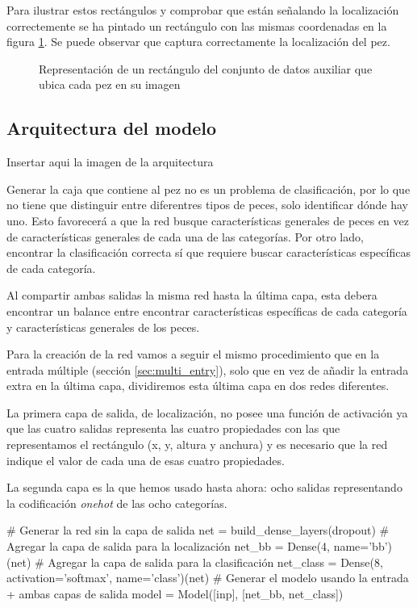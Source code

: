 Para ilustrar estos rectángulos y comprobar que están señalando la localización
correctemente se ha pintado un rectángulo con las mismas coordenadas en la
figura \ref{box}. Se puede observar que captura correctamente la localización
del pez.


\begin{figure}
  \caption{Representación de un rectángulo del conjunto de datos auxiliar que ubica cada pez en su imagen}
\label{box}
\end{figure}


\subsection{Arquitectura del modelo}

Insertar aqui la imagen de la arquitectura

Generar la caja que contiene al pez no es un problema de clasificación, por lo
que no tiene que distinguir entre diferentres tipos de peces, solo identificar
dónde hay uno. Esto favorecerá a que la red busque características generales de
peces en vez de características generales de cada una de las categorías. Por
otro lado, encontrar la clasificación correcta sí que requiere buscar
características específicas de cada categoría.

Al compartir ambas salidas la misma red hasta la última capa, esta debera
encontrar un balance entre encontrar características específicas de cada categoría y
características generales de los peces.

Para la creación de la red vamos a seguir el mismo procedimiento que en la
entrada múltiple (sección \ref{sec:multi_entry}), solo que en vez de añadir la
entrada extra en la última capa, dividiremos esta última capa en dos redes
diferentes.

La primera capa de salida, de localización, no posee una función de activación
ya que las cuatro salidas representa las cuatro propiedades con las que
representamos el rectángulo (x, y, altura y anchura) y es necesario que la red
indique el valor de cada una de esas cuatro propiedades.

La segunda capa es la que hemos usado hasta ahora: ocho salidas representando la
codificación \textit{onehot} de las ocho categorías.
\begin{python}
# Generar la red sin la capa de salida 
net = build_dense_layers(dropout)
# Agregar la capa de salida para la localización
net_bb = Dense(4, name='bb')(net)
# Agregar la capa de salida para la clasificación
net_class = Dense(8, activation='softmax', name='class')(net)
# Generar el modelo usando la entrada + ambas capas de salida
model = Model([inp], [net_bb, net_class])
\end{python}

